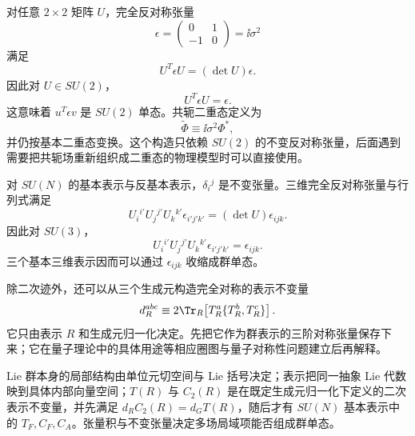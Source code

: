 对任意 $2\times2$ 矩阵 $U$，完全反对称张量
\begin{equation*}
 \epsilon=\begin{pmatrix}0&1\\-1&0\end{pmatrix}=\ii\sigma^2
\end{equation*}
满足
\begin{equation}
 U^T\epsilon U=(\det U)\epsilon.
 \label{eq:2x2-epsilon-det-dp68}
\end{equation}
因此对 $U\in SU(2)$，
\begin{equation}
 \boxed{U^T\epsilon U=\epsilon.}
 \label{eq:su2-epsilon-invariance-dp11}
\end{equation}
这意味着 $u^T\epsilon v$ 是 $SU(2)$ 单态。共轭二重态定义为
\begin{equation}
 \boxed{\widetilde\Phi\equiv\ii\sigma^2\Phi^*,}
 \label{eq:tilde-higgs-math-dp11}
\end{equation}
并仍按基本二重态变换。这个构造只依赖 $SU(2)$ 的不变反对称张量，后面遇到需要把共轭场重新组织成二重态的物理模型时可以直接使用。

对 $SU(N)$ 的基本表示与反基本表示，$\delta_i{}^j$ 是不变张量。三维完全反对称张量与行列式满足
\begin{equation}
 U_i{}^{i'}U_j{}^{j'}U_k{}^{k'}\epsilon_{i'j'k'}
 =(\det U)\epsilon_{ijk}.
 \label{eq:determinant-epsilon-identity-dp68}
\end{equation}
因此对 $SU(3)$，
\begin{equation}
 \boxed{
 U_i{}^{i'}U_j{}^{j'}U_k{}^{k'}\epsilon_{i'j'k'}
 =\epsilon_{ijk}.}
 \label{eq:su3-epsilon-invariant-dp11}
\end{equation}
三个基本三维表示因而可以通过 $\epsilon_{ijk}$ 收缩成群单态。

除二次迹外，还可以从三个生成元构造完全对称的表示不变量
\begin{equation}
 d_R^{abc}
 \equiv2\Tr_R\!\left[T_R^a\{T_R^b,T_R^c\}\right].
 \label{eq:anomaly-symmetric-trace-dp11}
\end{equation}
它只由表示 $R$ 和生成元归一化决定。先把它作为群表示的三阶对称张量保存下来；它在量子理论中的具体用途等相应圈图与量子对称性问题建立后再解释。

Lie 群本身的局部结构由单位元切空间与 Lie 括号决定；表示把同一抽象 Lie 代数映到具体内部向量空间；$T(R)$ 与 $C_2(R)$ 是在既定生成元归一化下定义的二次表示不变量，并先满足 $d_RC_2(R)=d_GT(R)$，随后才有 $SU(N)$ 基本表示中的 $T_F,C_F,C_A$。张量积与不变张量决定多场局域项能否组成群单态。
